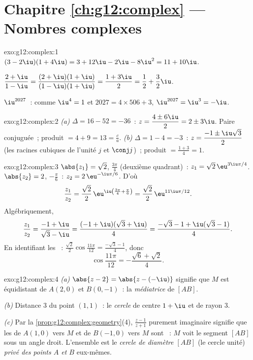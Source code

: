 \section*{Chapitre \ref{ch:g12:complex} --- Nombres complexes}

\begin{solution}{exo:g12:complex:1}
$(3-2\iu)(1+4\iu) = 3 + 12\iu - 2\iu - 8\iu^2 = 11 + 10\iu$.

$\dfrac{2+\iu}{1-\iu} = \dfrac{(2+\iu)(1+\iu)}{(1-\iu)(1+\iu)}
= \dfrac{1 + 3\iu}{2} = \dfrac12 + \dfrac32\iu$.

$\iu^{2027}$~: comme $\iu^4 = 1$ et $2027 = 4 \times 506 + 3$,
$\iu^{2027} = \iu^3 = -\iu$.
\end{solution}

\begin{solution}{exo:g12:complex:2}
\emph{(a)} $\Delta = 16 - 52 = -36$~:
$z = \dfrac{4 \pm 6\iu}{2} = 2 \pm 3\iu$. Paire conjuguée~; produit
$= 4 + 9 = 13 = \frac ca$. \emph{(b)} $\Delta = 1 - 4 = -3$~:
$z = \dfrac{-1 \pm \iu\sqrt3}{2}$ (les racines cubiques de l'unité $j$ et
$\conj j$)~; produit $= \frac{1 + 3}{4} = 1$.
\end{solution}

\begin{solution}{exo:g12:complex:3}
$\abs{z_1} = \sqrt2$,  $\frac{3\pi}{4}$ (deuxième quadrant)~:
$z_1 = \sqrt2\,\eu^{3\iu\pi/4}$.
$\abs{z_2} = 2$,  $-\frac\pi6$~:
$z_2 = 2\,\eu^{-\iu\pi/6}$. D'où
\[
\frac{z_1}{z_2} = \frac{\sqrt2}{2}\,\eu^{\iu\left(\frac{3\pi}{4} + \frac{\pi}{6}\right)}
= \frac{\sqrt2}{2}\,\eu^{11\iu\pi/12}.
\]
Algébriquement,
\[
\frac{z_1}{z_2} = \frac{-1+\iu}{\sqrt3 - \iu}
= \frac{(-1+\iu)(\sqrt3+\iu)}{4}
= \frac{-\sqrt3 - 1 + \iu(\sqrt3 - 1)}{4}.
\]
En identifiant les ~:
$\frac{\sqrt2}{2}\cos\frac{11\pi}{12} = \frac{-\sqrt3-1}{4}$, donc
\[
\cos\frac{11\pi}{12} = -\frac{\sqrt6 + \sqrt2}{4}.
\]
\end{solution}

\begin{solution}{exo:g12:complex:4}
\emph{(a)} $\abs{z - 2} = \abs{z - (-\iu)}$ signifie que $M$ est
équidistant de $A(2, 0)$ et $B(0, -1)$~: la \emph{médiatrice} de $[AB]$.

\emph{(b)} Distance $3$ du point $(1,1)$~: le \emph{cercle} de centre
$1 + \iu$ et de rayon $3$.

\emph{(c)} Par la \cref{prop:g12:complex:geometry}(4), $\frac{z-1}{z+1}$
purement imaginaire signifie que les  de $A(1,0)$ vers $M$ et de
$B(-1,0)$ vers $M$ sont ~: $M$ voit le segment $[AB]$ sous un
angle droit. L'ensemble est le \emph{cercle de diamètre $[AB]$} (le
cercle unité) \emph{privé des points $A$ et $B$} eux-mêmes.
\end{solution}

